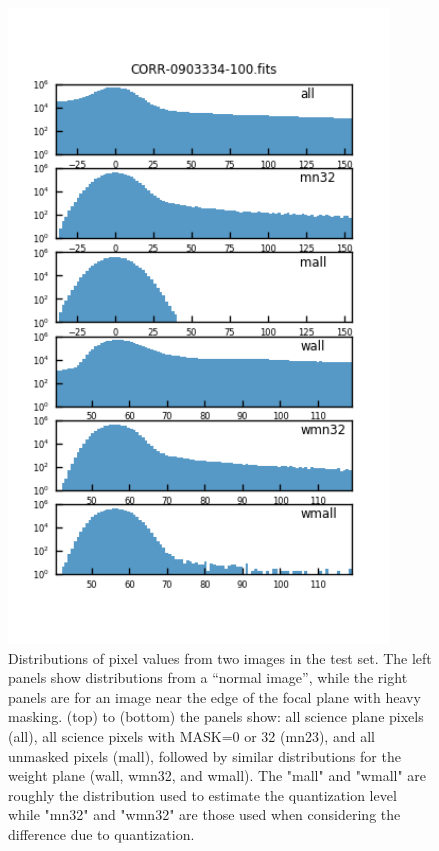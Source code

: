 \begin{figure}[t]
\begin{minipage}{.45\textwidth}
    \includegraphics[width=0.9\textwidth]{figure/imgdist_CORR-0903334-100.fits.png}
  \end{minipage}
\vspace{-32pt}
\caption{Distributions of pixel values from two images in the test set. The left panels show 
distributions from a ``normal image'', while the right panels are for an image near the edge 
of the focal plane with heavy masking.  (top) to (bottom) the panels show: all science plane pixels (all), 
all science pixels with MASK=0 or 32 (mn23), and all unmasked pixels (mall), followed by similar
distributions for the weight plane (wall, wmn32, and wmall).  The "mall" and "wmall" are roughly
the distribution used to estimate the quantization level while "mn32" and "wmn32" are those used
when considering the difference due to quantization.}
\label{pixel_dist}
\end{figure}

